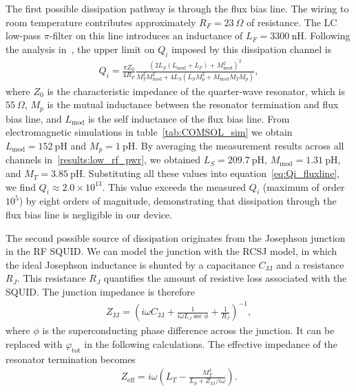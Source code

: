 \documentclass[10pt]{iopart}
\begin{document}
The first possible dissipation pathway is through the flux bias line. The wiring to room temperature contributes approximately $R_F = 23~\Omega$ of resistance. The LC low-pass $\pi$-filter on this line introduces an inductance of $L_F = 3300~\mathrm{nH}$. Following the analysis in~\cite{mates_microwave_2011}, the upper limit on $Q_i$ imposed by this dissipation channel is
\begin{gather}
Q_i =
\frac{\pi Z_0}{4 R_F}
\frac{\left(2L_S(L_{\mathrm{mod}} + L_F) + M_{\mathrm{mod}}^2\right)^2}
{M_T^2 M_{\mathrm{mod}}^2 + 4L_S\left(L_S M_p^2 + M_{\mathrm{mod}} M_T M_p\right)},
\label{eq:Qi_fluxline}
\end{gather}
where $Z_0$ is the characteristic impedance of the quarter-wave resonator, which is $55~\Omega$, $M_p$ is the mutual inductance between the resonator termination and flux bias line, and $L_{\text{mod}}$ is the self inductance of the flux bias line. From electromagnetic simulations in table~\ref{tab:COMSOL_sim} we obtain $L_{\mathrm{mod}} = 152~\mathrm{pH}$ and $M_p = 1~\mathrm{pH}$. By averaging the measurement results across all channels in~\cref{results:low_rf_pwr}, we obtained $L_S = 209.7~\mathrm{pH}$, $M_{\mathrm{mod}} = 1.31~\mathrm{pH}$, and $M_T = 3.85~\mathrm{pH}$. Substituting all these values into equation~\eqref{eq:Qi_fluxline}, we find $Q_i \approx 2.0 \times 10^{13}$. This value exceeds the measured $Q_i$ (maximum of order $10^5$) by eight orders of magnitude, demonstrating that dissipation through the flux bias line is negligible in our device.

The second possible source of dissipation originates from the Josephson junction in the RF SQUID. We can model the junction with the RCSJ model, in which the ideal Josephson inductance is shunted by a capacitance $C_{\mathrm{JJ}}$ and a resistance $R_J$. This resistance $R_J$ quantifies the amount of resistive loss associated with the SQUID. The junction impedance is therefore
\begin{gather}
Z_{\mathrm{JJ}} =
\left(
i \omega C_{\mathrm{JJ}}
+ \frac{1}{i \omega L_J \sec \phi}
+ \frac{1}{R_J}
\right)^{-1},
\label{eq:ZJJ}
\end{gather}
where $\phi$ is the superconducting phase difference across the junction. It can be replaced with $\varphi_{\mathrm{tot}}$ in the following calculations. The effective impedance of the resonator termination becomes
\begin{gather}
Z_{\mathrm{eff}} = i \omega
\left(
L_T - \frac{M_T^2}{L_S + Z_{\mathrm{JJ}}/i\omega}
\right).
\label{eq:Z_eff}
\end{gather}
\end{document}
